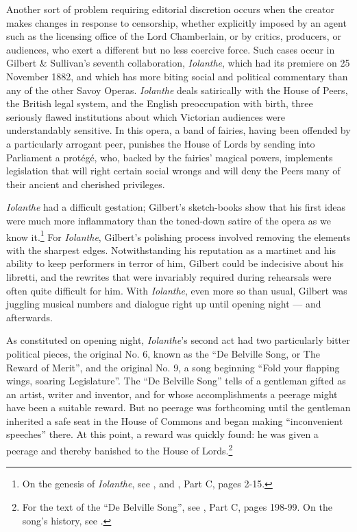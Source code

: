 \begin{paper}
Another sort of problem requiring editorial discretion occurs when the
creator makes changes in response to censorship, whether explicitly
imposed by an agent such as the licensing office of the Lord
Chamberlain, or by critics, producers, or audiences, who exert a
different but no less coercive force. Such cases occur in Gilbert \&
Sullivan's seventh collaboration, \emph{Iolanthe}, which had its
premiere on 25 November 1882, and which has more biting social and
political commentary than any of the other Savoy Operas. \emph{Iolanthe}
deals satirically with the House of Peers, the British legal system, and
the English preoccupation with birth, three seriously flawed
institutions about which Victorian audiences were understandably
sensitive. In this opera, a band of fairies, having been offended by a
particularly arrogant peer, punishes the House of Lords by sending into
Parliament a protégé, who, backed by the fairies' magical powers,
implements legislation that will right certain social wrongs and will
deny the Peers many of their ancient and cherished privileges.

\emph{Iolanthe} had a difficult gestation; Gilbert's sketch-books show
that his first ideas were much more inflammatory than the toned-down
satire of the opera as we know it.\footnote{On the genesis of
  \emph{Iolanthe}, see \citealt{perry_everything_2005}, and \citealt{perry_introduction_2017},
  Part C, pages 2-15.} For \emph{Iolanthe}, Gilbert's polishing process
involved removing the elements with the sharpest edges. Notwithstanding
his reputation as a martinet and his ability to keep performers in
terror of him, Gilbert could be indecisive about his libretti, and the
rewrites that were invariably required during rehearsals were often
quite difficult for him. With \emph{Iolanthe}, even more so than usual,
Gilbert was juggling musical numbers and dialogue right up until opening
night --- and afterwards.

As constituted on opening night, \emph{Iolanthe}'s second act had two
particularly bitter political pieces, the original No. 6, known as the
``De Belville Song, or The Reward of Merit'', and the original No. 9, a
song beginning ``Fold your flapping wings, soaring Legislature''. The
``De Belville Song'' tells of a gentleman gifted as an artist, writer
and inventor, and for whose accomplishments a peerage might have been a
suitable reward. But no peerage was forthcoming until the gentleman
inherited a safe seat in the House of Commons and began making
``inconvenient speeches'' there. At this point, a reward was quickly
found: he was given a peerage and thereby banished to the House of
Lords.\footnote{For the text of the ``De Belville Song'', see \citealt{gilbert_iolanthe_2017}, Part C, pages 198-99. On the song's history, see \citealt{miller_reward_2000}.}


\end{paper}
